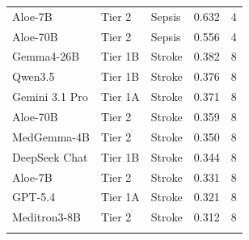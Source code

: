 \begin{longtable}{@{}llllr@{}}
Aloe-7B & Tier 2 & Sepsis & 0.632 & 4 \\
Aloe-70B & Tier 2 & Sepsis & 0.556 & 4 \\
Gemma4-26B & Tier 1B & Stroke & 0.382 & 8 \\
Qwen3.5 & Tier 1B & Stroke & 0.376 & 8 \\
Gemini 3.1 Pro & Tier 1A & Stroke & 0.371 & 8 \\
Aloe-70B & Tier 2 & Stroke & 0.359 & 8 \\
MedGemma-4B & Tier 2 & Stroke & 0.350 & 8 \\
DeepSeek Chat & Tier 1B & Stroke & 0.344 & 8 \\
Aloe-7B & Tier 2 & Stroke & 0.331 & 8 \\
GPT-5.4 & Tier 1A & Stroke & 0.321 & 8 \\
Meditron3-8B & Tier 2 & Stroke & 0.312 & 8 \\
\botrule
\end{longtable}
\normalsize
